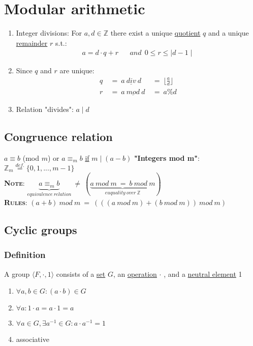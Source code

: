 \documentclass{report}
\begin{document}
	\section*{Modular arithmetic}
	\begin{enumerate}[-]
		\item Integer divisions: For $a,d \in \mathbb{Z}$ there exist a unique \underline{quotient} $q$ and a unique \underline{remainder} $r$ s.t.:
		\begin{align*}
			a = d \cdot q + r & & and \ \ 0 \leq r \leq \mid d-1 \mid
		\end{align*}
		\item Since $q$ and $r$ are unique:
		\begin{align*}
			q \ & = \ a \ \underline{div} \ d \ & = \ \lfloor \frac{a}{d} \rfloor \\
			r \ & = \ a \ \underline{mod} \ d \ & = \ a \% d
		\end{align*}
		\item Relation "divides": $a \mid d$
	\end{enumerate}
	\subsection*{Congruence relation}
		$a \equiv b$ (mod $m$) or $a \equiv _m b$ \underline{if} $m \mid (a-b)$
		\textbf{"Integers mod m"}: $\mathbb{Z}_m \stackrel{def.}{=}\{0,1,...,m-1\}$ \\
		\textbf{\textsc{Note}}: $\underbrace{a \equiv _m b}_{equivalence \ relation} \ \neq \ ( \underbrace{a \ mod \ m \ = \ b \ mod \ m}_{euquality \ over \ \mathbb{Z}})$ \\
		\textbf{\textsc{Rules}}: $(a+b) \ mod \ m \ = \ (((a \ mod \ m) + (b \ mod \ m)) \ mod \ m)$
	\subsection*{Cyclic groups}
	\subsubsection*{Definition}
	A group $\langle F, \cdot , 1 \rangle$ consists of a \underline{set} $G$, an \underline{operation} $\cdot$ , and a \underline{neutral element} 1
	\begin{enumerate}
		\item $\forall a,b \in G: (a \cdot b) \in G$
		\item $\forall a: 1 \cdot a = a \cdot 1 = a$
		\item $\forall a \in G, \exists a^{-1} \in G: a \cdot a^{-1} = 1$
		\item associative
	\end{enumerate}
\end{document}

